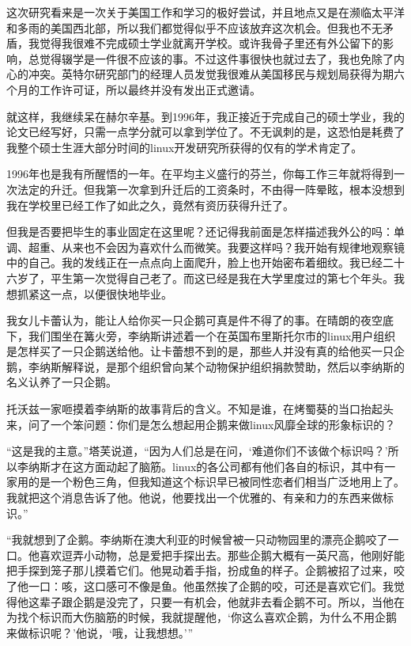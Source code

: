这次研究看来是一次关于美国工作和学习的极好尝试，并且地点又是在濒临太平洋和多雨的美国西北部，所以我们都觉得似乎不应该放弃这次机会。但我也不无矛盾，我觉得我很难不完成硕士学业就离开学校。或许我骨子里还有外公留下的影响，总觉得辍学是一件很不应该的事。不过这件事很快也就过去了，我也免除了内心的冲突。英特尔研究部门的经理人员发觉我很难从美国移民与规划局获得为期六个月的工作许可证，所以最终并没有发出正式邀请。

就这样，我继续呆在赫尔辛基。到1996年，我正接近于完成自己的硕士学业，我的论文已经写好，只需一点学分就可以拿到学位了。不无讽刺的是，这恐怕是耗费了我整个硕士生涯大部分时间的linux开发研究所获得的仅有的学术肯定了。

1996年也是我有所醒悟的一年。在平均主义盛行的芬兰，你每工作三年就将得到一次法定的升迁。但我第一次拿到升迁后的工资条时，不由得一阵晕眩，根本没想到我在学校里已经工作了如此之久，竟然有资历获得升迁了。

但我是否要把毕生的事业固定在这里呢？还记得我前面是怎样描述我外公的吗：单调、超重、从来也不会因为喜欢什么而微笑。我要这样吗？我开始有规律地观察镜中的自己。我的发线正在一点点向上面爬升，脸上也开始密布着细纹。我已经二十六岁了，平生第一次觉得自己老了。而这已经是我在大学里度过的第七个年头。我想抓紧这一点，以便很快地毕业。

我女儿卡蕾认为，能让人给你买一只企鹅可真是件不得了的事。在晴朗的夜空底下，我们围坐在篝火旁，李纳斯讲述着一个在英国布里斯托尔市的linux用户组织是怎样买了一只企鹅送给他。让卡蕾想不到的是，那些人并没有真的给他买一只企鹅，李纳斯解释说，是那个组织曾向某个动物保护组织捐款赞助，然后以李纳斯的名义认养了一只企鹅。

托沃兹一家咂摸着李纳斯的故事背后的含义。不知是谁，在烤蜀葵的当口抬起头来，问了一个笨问题：你们是怎么想起用企鹅来做linux风靡全球的形象标识的？

“这是我的主意。”塔芙说道，“因为人们总是在问，‘难道你们不该做个标识吗？’所以李纳斯才在这方面动起了脑筋。linux的各公司都有他们各自的标识，其中有一家用的是一个粉色三角，但我知道这个标识早已被同性恋者们相当广泛地用上了。我就把这个消息告诉了他。他说，他要找出一个优雅的、有亲和力的东西来做标识。”

“我就想到了企鹅。李纳斯在澳大利亚的时候曾被一只动物园里的漂亮企鹅咬了一口。他喜欢逗弄小动物，总是爱把手探出去。那些企鹅大概有一英尺高，他刚好能把手探到笼子那儿摸着它们。他晃动着手指，扮成鱼的样子。企鹅被招了过来，咬了他一口：咳，这口感可不像是鱼。他虽然挨了企鹅的咬，可还是喜欢它们。我觉得他这辈子跟企鹅是没完了，只要一有机会，他就非去看企鹅不可。所以，当他在为找个标识而大伤脑筋的时候，我就提醒他，‘你这么喜欢企鹅，为什么不用企鹅来做标识呢？’他说，‘哦，让我想想。’”


